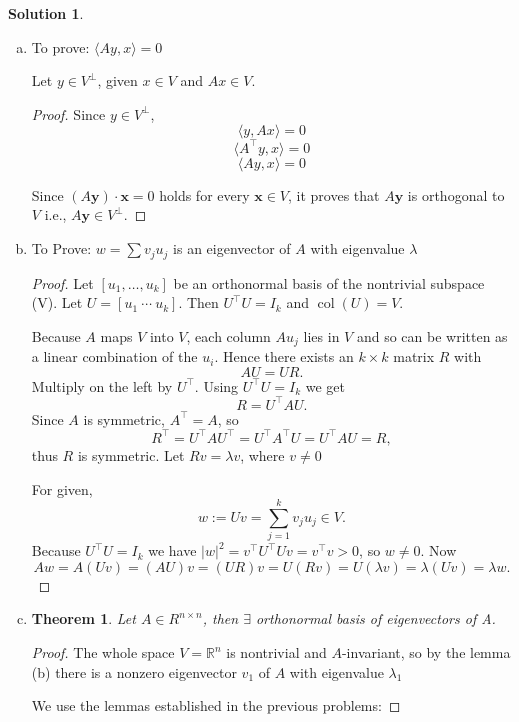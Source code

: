 \documentclass{amsart}[11pt]
\newtheorem{theorem}{Theorem}[section]
\theoremstyle{definition}
\newtheorem*{solution}{Solution}
\begin{document}
\begin{solution}
    \begin{enumerate}[(a)]
        \item To prove: $\langle Ay, x\rangle=0$
    
    Let $y\in V^\perp$, given $x\in V$ and $Ax\in V$.
    
    \begin{proof}
        Since $y\in V^\perp$,
        \[\langle y, Ax\rangle=0\]
        \[\langle A^\top y, x\rangle=0\]
        \[\langle A y, x\rangle=0\]

        Since $(A\mathbf{y}) \cdot \mathbf{x} = 0$ holds for every $\mathbf{x} \in V$, it proves that $A\mathbf{y}$ is orthogonal to $V$ i.e., $A\mathbf{y} \in V^\perp$.
    \end{proof}
    \item To Prove: $w  = \sum v_ju_j$ is an eigenvector of $A$ with eigenvalue $\lambda$
    \begin{proof}
        Let $[u_1,\dots,u_k]$ be an orthonormal basis of the nontrivial subspace (V). Let $U=[u_1\ \cdots\ u_k]$. Then $U^\top U=I_k$ and $\operatorname{col}(U)=V$.

    Because $A$ maps $V$ into $V$, each column $Au_j$ lies in $V$ and so can be written as a linear combination of the $u_i$. Hence there exists an $k\times k$ matrix $R$ with
    \[
    AU = U R.
    \]
    Multiply on the left by $U^\top$. Using $U^\top U=I_k$ we get
    \[
    R = U^\top A U.
    \]
    Since $A$ is symmetric, $A^\top=A$, so
    \[
    R^\top = U^\top A U^\top = U^\top A^\top U = U^\top A U = R,
    \]
    thus $R$ is symmetric.
    Let $Rv=\lambda v$, where $v\neq0$
    
    For given,
    \[
        w := Uv = \sum_{j=1}^k v_j u_j \in V.
    \]
    Because $U^\top U=I_k$ we have $|w|^2 = v^\top U^\top U v = v^\top v>0$, so $w\neq0$. Now
    \[
    Aw = A(Uv) = (AU)v = (UR)v = U(Rv) = U(\lambda v) = \lambda(Uv)=\lambda w.
    \]
    \end{proof}
    \item \begin{theorem}
        Let $A\in R^{n\times n}$, then $\exists$ orthonormal basis of eigenvectors of A.
    \end{theorem}
    \begin{proof}
            The whole space $V=\mathbb R^n$ is nontrivial and $A$-invariant, so by the lemma (b) there is a nonzero eigenvector $v_1$ of $A$ with eigenvalue $\lambda_1$
    
           We use the lemmas established in the previous problems:
           

\end{proof}
\end{enumerate}
\end{solution}
\end{document}
